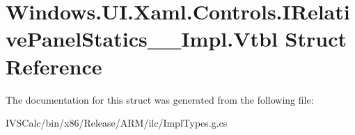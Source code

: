 \hypertarget{struct_windows_1_1_u_i_1_1_xaml_1_1_controls_1_1_i_relative_panel_statics_____impl_1_1_vtbl}{}\section{Windows.\+U\+I.\+Xaml.\+Controls.\+I\+Relative\+Panel\+Statics\+\_\+\+\_\+\+Impl.\+Vtbl Struct Reference}
\label{struct_windows_1_1_u_i_1_1_xaml_1_1_controls_1_1_i_relative_panel_statics_____impl_1_1_vtbl}


The documentation for this struct was generated from the following file\+:\begin{DoxyCompactItemize}
\item 
I\+V\+S\+Calc/bin/x86/\+Release/\+A\+R\+M/ilc/Impl\+Types.\+g.\+cs\end{DoxyCompactItemize}
